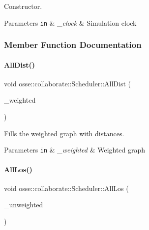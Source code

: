 Constructor. 


\begin{DoxyParams}[1]{Parameters}
\mbox{\tt in}  & {\em \+\_\+clock} & Simulation clock \\
\hline
\end{DoxyParams}


\subsubsection{Member Function Documentation}
\mbox{\label{classosse_1_1collaborate_1_1_scheduler_a8dbb2201286d8c4f064cd1371d60ca90}} 
\paragraph{\texorpdfstring{All\+Dist()}{AllDist()}}
{\footnotesize\ttfamily void osse\+::collaborate\+::\+Scheduler\+::\+All\+Dist (\begin{DoxyParamCaption}\item[{\hyperlink{classosse_1_1collaborate_1_1_graph_weighted}{Graph\+Weighted} $\ast$}]{\+\_\+weighted }\end{DoxyParamCaption})}



Fills the weighted graph with distances. 


\begin{DoxyParams}[1]{Parameters}
\mbox{\tt in}  & {\em \+\_\+weighted} & Weighted graph \\
\hline
\end{DoxyParams}
\mbox{\label{classosse_1_1collaborate_1_1_scheduler_aab675402de557bac32d7cfc71aaf45b0}} 
\paragraph{\texorpdfstring{All\+Los()}{AllLos()}}
{\footnotesize\ttfamily void osse\+::collaborate\+::\+Scheduler\+::\+All\+Los (\begin{DoxyParamCaption}\item[{\hyperlink{classosse_1_1collaborate_1_1_graph_unweighted}{Graph\+Unweighted} $\ast$}]{\+\_\+unweighted }\end{DoxyParamCaption})}



